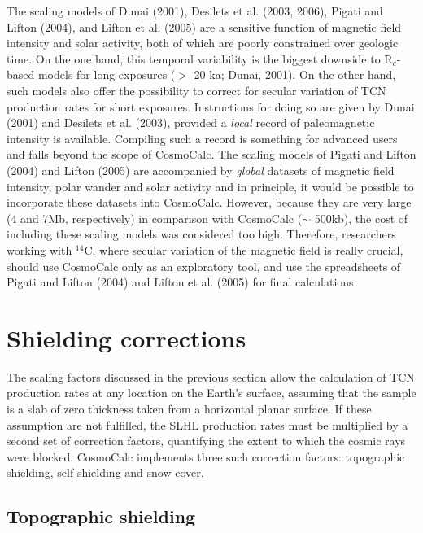 \documentclass{article}
\begin{document}
The scaling  models of  Dunai (2001), Desilets  et al.   (2003, 2006),
Pigati and  Lifton (2004),  and Lifton et  al. (2005) are  a sensitive
function of magnetic field intensity and solar activity, both of which
are  poorly constrained  over geologic  time.  On  the one  hand, this
temporal variability is the biggest downside to R$_c$-based models for
long  exposures ($>$ 20  ka; Dunai,  2001).  On  the other  hand, such
models also offer the possibility  to correct for secular variation of
TCN production  rates for short  exposures. Instructions for  doing so
are given by Dunai (2001) and  Desilets et al. (2003), provided a {\it
  local}  record of paleomagnetic  intensity is  available.  Compiling
such a  record is  something for advanced  users and falls  beyond the
scope of  CosmoCalc.  The scaling  models of Pigati and  Lifton (2004)
and Lifton (2005) are accompanied by {\it global} datasets of magnetic
field intensity, polar wander and  solar activity and in principle, it
would  be  possible to  incorporate  these  datasets  into CosmoCalc.  
However,  because they  are very  large (4  and 7Mb,  respectively) in
comparison with CosmoCalc ($\sim$  500kb), the cost of including these
scaling  models  was  considered  too  high.   Therefore,  researchers
working with  $^{14}$C, where secular variation of  the magnetic field
is really crucial,  should use CosmoCalc only as  an exploratory tool,
and use the spreadsheets of Pigati and Lifton (2004) and Lifton et al.
(2005) for final calculations.

\section{Shielding corrections}\label{sec:shielding}

The  scaling  factors discussed  in  the  previous  section allow  the
calculation of  TCN production  rates at any  location on  the Earth's
surface, assuming  that the sample is  a slab of  zero thickness taken
from  a  horizontal  planar  surface.   If these  assumption  are  not
fulfilled, the  SLHL production rates  must be multiplied by  a second
set of correction factors, quantifying  the extent to which the cosmic
rays  were  blocked.    CosmoCalc  implements  three  such  correction
factors: topographic shielding, self shielding and snow cover.

\subsection{Topographic shielding}\label{sec:topo}
\end{document}
